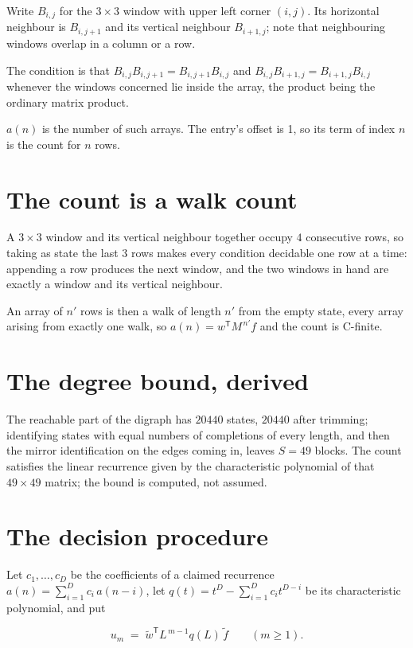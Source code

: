 \documentclass[11pt]{article}
\theoremstyle{definition}
\begin{document}
Write $B_{i,j}$ for the $3\times3$ window with upper left corner $(i,j)$. Its horizontal neighbour is $B_{i,j+1}$ and its vertical neighbour $B_{i+1,j}$; note that neighbouring windows overlap in a column or a row.

The condition is that $B_{i,j}B_{i,j+1} = B_{i,j+1}B_{i,j}$ and $B_{i,j}B_{i+1,j} = B_{i+1,j}B_{i,j}$ whenever the windows concerned lie inside the array, the product being the ordinary matrix product.

$a(n)$ is the number of such arrays. The entry's offset is 1, so its term of index $n$ is the count for $n$ rows.

\section{The count is a walk count}

A $3\times3$ window and its vertical neighbour together occupy $4$ consecutive rows, so taking as state the last $3$ rows makes every condition decidable one row at a time: appending a row produces the next window, and the two windows in hand are exactly a window and its vertical neighbour.

An array of $n'$ rows is then a walk of length $n'$ from the empty state, every array arising from exactly one walk, so $a(n) = w^{\mathsf T}M^{\,n'}f$ and the count is C-finite.

\section{The degree bound, derived}

The reachable part of the digraph has $20440$ states, $20440$ after trimming; identifying states with equal numbers of completions of every length, and then the mirror identification on the edges coming in, leaves $S = 49$ blocks. The count satisfies the linear recurrence given by the characteristic polynomial of that $49\times49$ matrix; the bound is computed, not assumed.

\section{The decision procedure}

Let $c_1,\dots,c_D$ be the coefficients of a claimed recurrence $a(n) = \sum_{i=1}^{D} c_i\,a(n-i)$, let $q(t) = t^{D} - \sum_{i=1}^{D} c_i t^{D-i}$ be its characteristic polynomial, and put

\[u_m \;=\; \tilde w^{\mathsf T} L^{\,m-1} q(L)\,\tilde f \qquad (m \ge 1).\]
\end{document}
